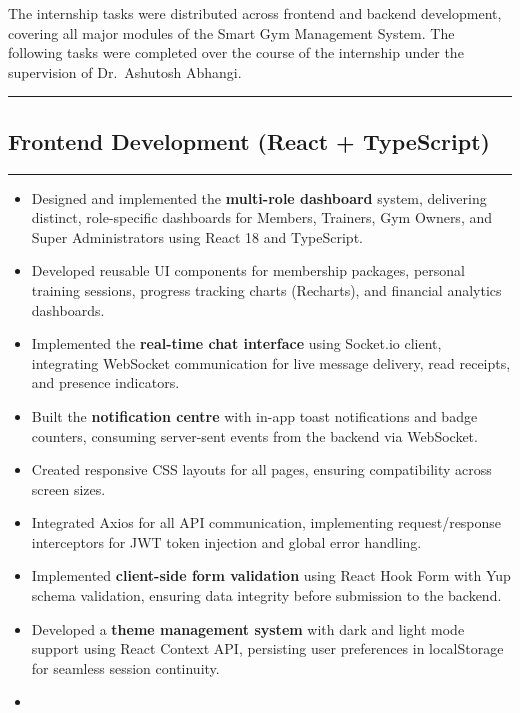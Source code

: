 \documentclass[
  12pt,
  a4paperpaper,
]{report}
\providecommand{\tightlist}{%
  \setlength{\itemsep}{0pt}\setlength{\parskip}{0pt}\setlength{\topsep}{2pt}\setlength{\partopsep}{0pt}}
\begin{document}
The internship tasks were distributed across frontend and backend
development, covering all major modules of the Smart Gym Management
System. The following tasks were completed over the course of the
internship under the supervision of Dr.~Ashutosh Abhangi.

\smallskip\noindent

\rule{\textwidth}{0.3pt}

\subsection{Frontend Development (React +
TypeScript)}\label{frontend-development-react-typescript}

\noindent

\rule{\textwidth}{0.3pt}\medskip

\begin{itemize}
\tightlist
\item
  Designed and implemented the \textbf{multi-role dashboard} system,
  delivering distinct, role-specific dashboards for Members, Trainers,
  Gym Owners, and Super Administrators using React 18 and TypeScript.
\item
  Developed reusable UI components for membership packages, personal
  training sessions, progress tracking charts (Recharts), and financial
  analytics dashboards.
\item
  Implemented the \textbf{real-time chat interface} using Socket.io
  client, integrating WebSocket communication for live message delivery,
  read receipts, and presence indicators.
\item
  Built the \textbf{notification centre} with in-app toast notifications
  and badge counters, consuming server-sent events from the backend via
  WebSocket.
\item
  Created responsive CSS layouts for all pages, ensuring compatibility
  across screen sizes.
\item
  Integrated Axios for all API communication, implementing
  request/response interceptors for JWT token injection and global error
  handling.
\item
  Implemented \textbf{client-side form validation} using React Hook Form
  with Yup schema validation, ensuring data integrity before submission
  to the backend.
\item
  Developed a \textbf{theme management system} with dark and light mode
  support using React Context API, persisting user preferences in
  localStorage for seamless session continuity.
\item

\end{itemize}
\end{document}

